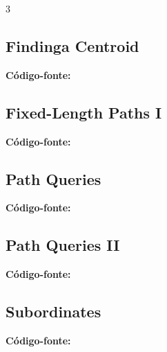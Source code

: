 \documentclass[8pt]{extarticle}
\begin{document}
\begin{multicols*}{3}
\subsection{Findinga Centroid}
\begin{caixaenunciado}

\end{caixaenunciado}
\vspace{0.3cm}
\noindent\textbf{Código-fonte:}


\subsection{Fixed-Length Paths I}
\begin{caixaenunciado}

\end{caixaenunciado}
\vspace{0.3cm}
\noindent\textbf{Código-fonte:}


\subsection{Path Queries}
\begin{caixaenunciado}

\end{caixaenunciado}
\vspace{0.3cm}
\noindent\textbf{Código-fonte:}


\subsection{Path Queries II}
\begin{caixaenunciado}

\end{caixaenunciado}
\vspace{0.3cm}
\noindent\textbf{Código-fonte:}


\subsection{Subordinates}
\begin{caixaenunciado}

\end{caixaenunciado}
\vspace{0.3cm}
\noindent\textbf{Código-fonte:}



\end{multicols*}
\end{document}
